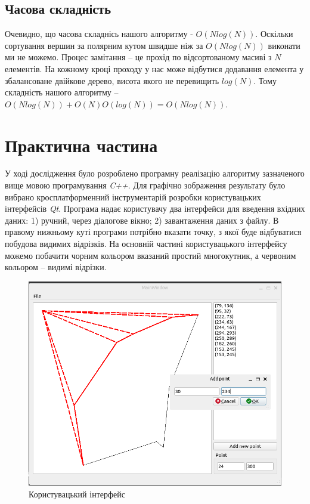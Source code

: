 \documentclass[a4paper, 12pt]{article}
\begin{document}
\subsection{Часова складність}

Очевидно, що часова складнісь нашого алгоритму - $O(Nlog(N))$. Оскільки сортування вершин за полярним кутом швидше ніж за $O(Nlog(N))$ виконати ми не можемо. Процес замітання -- це прохід по відсортованому масиві з $N$ елементів. На кожному кроці проходу у нас може відбутися додавання елемента у збалансоване двійкове дерево, висота якого не перевищить $log(N)$. Тому складність нашого алгоритму -- $O(Nlog(N)) + O(N)O(log(N)) = O(Nlog(N))$.

\section{Практична частина}

У ході дослідження було розроблено програмну реалізацію алгоритму зазначеного вище мовою програмування \textit{C++}. Для графічно зображення результату було вибрано кросплатформенний інструментарій розробки користувацьких інтерфейсів \textit{Qt}. Програма надає користувачу два інтерфейси для введення вхідних даних: 1) ручний, через діалогове вікно; 2) завантаження даних з файлу. В правому нижньому куті програми потрібно вказати точку, з якої буде відбуватися побудова видимих відрізків. На основній частині користувацького інтерфейсу можемо побачити чорним кольором вказаний простий многокутник, а червоним кольором -- видимі відрізки.

\begin{figure}[H]
\includegraphics[scale=0.5]{img/UI.png}
\caption{Користувацький інтерфейс}
\end{figure}
\end{document}
